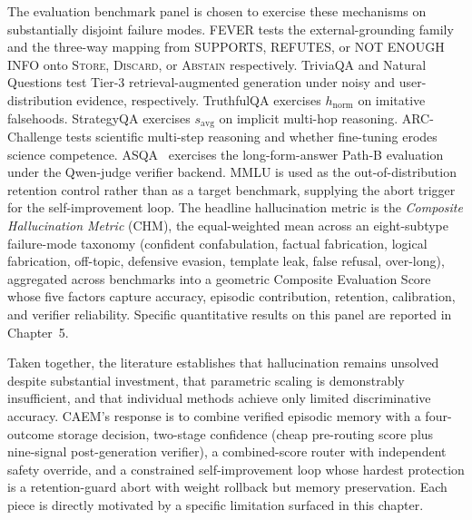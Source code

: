 The evaluation benchmark panel is chosen to exercise these mechanisms on substantially disjoint failure modes. FEVER \cite{thorne-etal-2018-fever} tests the external-grounding family and the three-way mapping from SUPPORTS, REFUTES, or NOT ENOUGH INFO onto \textsc{Store}, \textsc{Discard}, or \textsc{Abstain} respectively. TriviaQA \cite{joshi-etal-2017-triviaqa} and Natural Questions \cite{kwiatkowski-etal-2019-natural} test Tier-3 retrieval-augmented generation under noisy and user-distribution evidence, respectively. TruthfulQA \cite{lin-etal-2022-truthfulqa} exercises $h_{\text{norm}}$ on imitative falsehoods. StrategyQA \cite{10.1162/tacl_a_00370} exercises $s_{\text{avg}}$ on implicit multi-hop reasoning. ARC-Challenge \cite{clark2018think} tests scientific multi-step reasoning and whether fine-tuning erodes science competence. ASQA~\cite{stelmakh2022asqa} exercises the long-form-answer Path-B evaluation under the Qwen-judge verifier backend. MMLU \cite{hendrycks2021measuring} is used as the out-of-distribution retention control rather than as a target benchmark, supplying the abort trigger for the self-improvement loop. The headline hallucination metric is the \emph{Composite Hallucination Metric} (CHM), the equal-weighted mean across an eight-subtype failure-mode taxonomy (confident confabulation, factual fabrication, logical fabrication, off-topic, defensive evasion, template leak, false refusal, over-long), aggregated across benchmarks into a geometric Composite Evaluation Score whose five factors capture accuracy, episodic contribution, retention, calibration, and verifier reliability. Specific quantitative results on this panel are reported in Chapter~5.

Taken together, the literature establishes that hallucination remains unsolved despite substantial investment, that parametric scaling is demonstrably insufficient, and that individual methods achieve only limited discriminative accuracy. CAEM's response is to combine verified episodic memory with a four-outcome storage decision, two-stage confidence (cheap pre-routing score plus nine-signal post-generation verifier), a combined-score router with independent safety override, and a constrained self-improvement loop whose hardest protection is a retention-guard abort with weight rollback but memory preservation. Each piece is directly motivated by a specific limitation surfaced in this chapter.